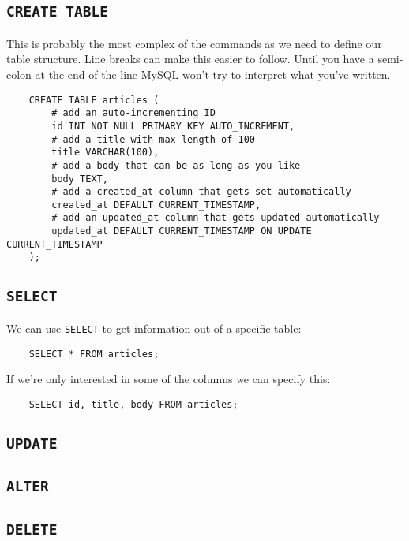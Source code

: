 \subsection{\texttt{CREATE TABLE}}

This is probably the most complex of the commands as we need to define our table structure. Line breaks can make this easier to follow. Until you have a semi-colon at the end of the line MySQL won't try to interpret what you've written.

\begin{verbatim}
    CREATE TABLE articles (
        # add an auto-incrementing ID
        id INT NOT NULL PRIMARY KEY AUTO_INCREMENT,
        # add a title with max length of 100
        title VARCHAR(100),
        # add a body that can be as long as you like
        body TEXT,
        # add a created_at column that gets set automatically
        created_at DEFAULT CURRENT_TIMESTAMP,
        # add an updated_at column that gets updated automatically
        updated_at DEFAULT CURRENT_TIMESTAMP ON UPDATE CURRENT_TIMESTAMP
    );
\end{verbatim}

\subsection{\texttt{SELECT}}

We can use \texttt{SELECT} to get information out of a specific table:

\begin{verbatim}
    SELECT * FROM articles;
\end{verbatim}

If we're only interested in some of the columns we can specify this:

\begin{verbatim}
    SELECT id, title, body FROM articles;
\end{verbatim}



\subsection{\texttt{UPDATE}}


\subsection{\texttt{ALTER}}


\subsection{\texttt{DELETE}}


